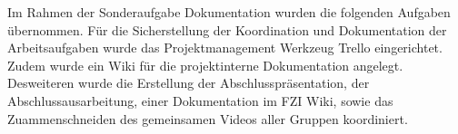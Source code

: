 Im Rahmen der Sonderaufgabe Dokumentation wurden die folgenden Aufgaben übernommen. Für die Sicherstellung der Koordination und Dokumentation der Arbeitsaufgaben wurde das Projektmanagement Werkzeug Trello eingerichtet. Zudem wurde ein Wiki für die projektinterne Dokumentation angelegt. Desweiteren wurde die Erstellung der Abschlusspräsentation, der Abschlussausarbeitung, einer Dokumentation im FZI Wiki, sowie das Zuammenschneiden des gemeinsamen Videos aller Gruppen koordiniert.